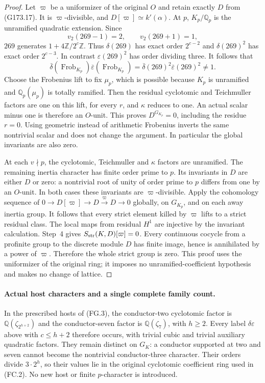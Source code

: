 \begin{proof}
Let $\varpi$ be a uniformizer of the original $O$ and retain exactly
$D$ from (G173.17).  It is $\varpi$-divisible, and
$D[\varpi]\simeq k'(\alpha)$.
At $p$, $K_p/\mathbb Q_p$ is the unramified quadratic extension.
Since
\[
             v_2(269-1)=2,\qquad v_2(269+1)=1,
 \tag{G173.31}
\]
$269$ generates $1+4\mathbb Z/2^c\mathbb Z$.
Thus $\delta(269)$ has exact order $2^{c-2}$ and
$\delta(269)^2$ has exact order $2^{c-3}$.
In contrast $\varepsilon(269)^2$ has order dividing three.
It follows that
\[
      \overline\delta(\operatorname{Frob}_{K_p})
      \overline\varepsilon(\operatorname{Frob}_{K_p})
                 =\overline\delta(269)^2
                    \overline\varepsilon(269)^2\ne1.
 \tag{G173.32}
\]
Choose the Frobenius lift to fix $\mu_p$, which is possible because
$K_p$ is unramified and $\mathbb Q_p(\mu_p)$ is totally ramified.
Then the residual cyclotomic and Teichmuller factors are one on
this lift, for every $r$, and $\kappa$ reduces to one.
An actual scalar minus one is therefore an $O$-unit.
This proves $D^{G_{K_p}}=0$, including the residue $r=0$.
Using geometric instead of arithmetic Frobenius inverts the same
nontrivial scalar and does not change the argument.
In particular the global invariants are also zero.

At each $v\nmid p$, the cyclotomic, Teichmuller and $\kappa$ factors
are unramified.  The remaining inertia character has finite order
prime to $p$.  Its invariants in $D$ are either $D$ or zero:
a nontrivial root of unity of order prime to $p$ differs from one
by an $O$-unit.  In both cases these invariants are
$\varpi$-divisible.
Apply the cohomology sequence of
$0\to D[\varpi]\to D\xrightarrow{\varpi}D\to0$ globally,
on $G_{K_p}$, and on each away inertia group.
It follows that every strict element killed by $\varpi$ lifts to a
strict residual class.  The local maps from residual $H^1$ are
injective by the invariant calculation.  Step~4 gives
$S_{\rm str}(K,D)[\varpi]=0$.
Every continuous cocycle from a profinite group to the discrete
module $D$ has finite image, hence is annihilated by a power of
$\varpi$.  Therefore the whole strict group is zero.
This proof uses the uniformizer of the original ring; it imposes
no unramified-coefficient hypothesis and makes no change of lattice.
\end{proof}

\paragraph{Actual host characters and a single complete family count.}
In the prescribed hosts of (FG.3), the conductor-two cyclotomic
factor is $\mathbb Q(\zeta_{2^{h+2}})$ and the conductor-seven
factor is $\mathbb Q(\zeta_7)$, with $h\geq2$.
Every label $\delta\varepsilon$ above with $c\leq h+2$ therefore
occurs, with trivial cubic and trivial auxiliary quadratic factors.
They remain distinct on $G_K$: a conductor supported at two and
seven cannot become the nontrivial conductor-three character.
Their orders divide $3\cdot2^h$, so their values lie in the
original cyclotomic coefficient ring used in (FC.2).
No new host or finite $p$-character is introduced.


